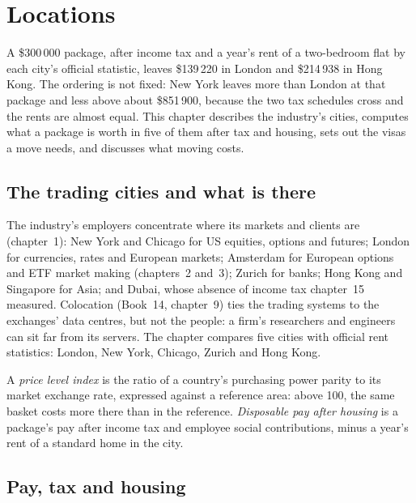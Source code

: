 \chapter{Locations}\label{ch:in:locations}

A \$300\,000 package, after income tax and a year's rent of a two-bedroom flat by each city's official statistic, leaves
\$139\,220 in London and \$214\,938 in Hong Kong. The ordering is not fixed: New York leaves more than London at that
package and less above about \$851\,900, because the two tax schedules cross and the rents are almost equal. This chapter
describes the industry's cities, computes what a package is worth in five of them after tax and housing, sets out the
visas a move needs, and discusses what moving costs.

\section{The trading cities and what is there}

The industry's employers concentrate where its markets and clients are (chapter~1): New York and Chicago for US equities,
options and futures; London for currencies, rates and European markets; Amsterdam for European options and ETF market
making (chapters~2 and~3); Zurich for banks; Hong Kong and Singapore for Asia; and Dubai, whose absence of income tax
chapter~15 measured. Colocation (Book~14, chapter~9) ties the trading systems to the
exchanges' data centres, but not the people: a firm's researchers and engineers can sit far from its servers. The
chapter compares five cities with official rent statistics: London, New York, Chicago, Zurich and Hong Kong.

\begin{definition}\label{def:in:locations:pli}
A \emph{price level index} is the ratio of a country's purchasing power parity to its market
exchange rate, expressed against a reference area: above 100, the same basket costs more there than in the reference.
\emph{Disposable pay after housing} is a package's pay after income tax and employee
social contributions, minus a year's rent of a standard home in the city.
\end{definition}

\section{Pay, tax and housing}

